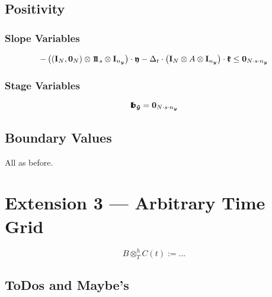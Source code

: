\documentclass{article}
\newcommand{\defeq}{\mathrel{:=}}%
\newcommand{\kron}{\otimes}%
\newcommand{\dkron}[2][]{\mathbin{\kron_{#2}^{#1}}}%
\newcommand{\vectorfont}[1]{\boldsymbol{#1}}%
\newcommand{\greekvectorfont}[1]{\boldsymbol{#1}}%
\newcommand{\matrixfont}[1]{\mathbf{#1}}%
\newcommand{\yvec}{\vectorfont{y}}
\newcommand{\tildeyvec}{\vectorfont{\tilde{y}}}
\newcommand{\kfrakvec}{\vectorfont{\mathfrak{k}}}
\newcommand{\yfrakvec}{\vectorfont{\mathfrak{y}}}
\newcommand{\nullvec}{\greekvectorfont{0}}
\newcommand{\lbfrakvec}{\vectorfont{\mathfrak{l\negthinspace b}}}
\newcommand{\einsvec}{\vectorfont{1}\negthinspace\negthinspace\vectorfont{1}} %
\newcommand{\Imat}{\matrixfont{I}}%
\begin{document}
\subsection*{Positivity}
\subsubsection*{Slope Variables}
\[
- \left((\Imat_N, \nullvec_N)  \kron \einsvec_s  \kron \Imat_{n_{\yvec}}   \right)\cdot \yfrakvec
- \Delta_t \cdot \left( \Imat_N \kron A \kron \Imat_{n_{\yvec}}  \right) \cdot \kfrakvec
\leq \nullvec_{N \cdot s \cdot n_{\yvec}}
\]
\subsubsection*{Stage Variables}
\[
\lbfrakvec_{\tildeyvec} = \nullvec_{N \cdot s \cdot n_{\yvec}}
\]

\subsection*{Boundary Values}
All as before.



%

\section*{Extension 3 --- Arbitrary Time Grid}

\[
B \dkron[h]{T} C(t) \defeq ...
\]

\appendix

\subsection*{ToDos and Maybe's}
\end{document}
